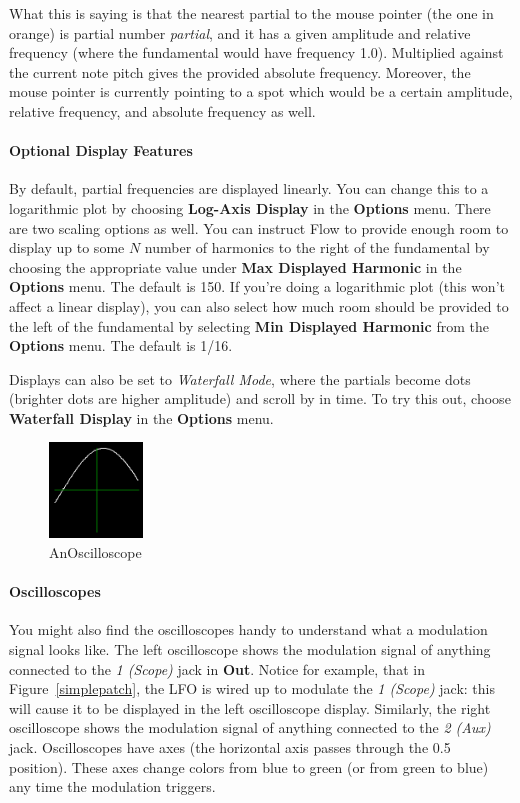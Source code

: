 \documentclass{article}
\begin{document}
What this is saying is that the nearest partial to the mouse pointer (the one in orange) is partial number {\it partial}, and it has a given amplitude and relative frequency (where the fundamental would have frequency 1.0).  Multiplied against the current note pitch gives the provided absolute frequency.  Moreover, the mouse pointer is currently pointing to a spot which would be a certain amplitude, relative frequency, and absolute frequency as well.


\paragraph{Optional Display Features}
By default, partial frequencies are displayed linearly.  You can change this to a logarithmic plot by choosing {\bf Log-Axis Display} in the {\bf Options} menu.  There are two scaling options as well.  You can instruct Flow to provide enough room to display up to some \(N\) number of harmonics to the right of the fundamental by choosing the appropriate value under {\bf Max Displayed Harmonic} in the {\bf Options} menu.  The default is 150. If you're doing a logarithmic plot (this won't affect a linear display), you can also select how much room should be provided to the left of the fundamental by selecting {\bf Min Displayed Harmonic} from the {\bf Options} menu.  The default is 1/16.

Displays can also be set to {\it Waterfall Mode}, where the partials become dots (brighter dots are higher amplitude) and scroll by in time.  To try this out, choose {\bf Waterfall Display} in the {\bf Options} menu.

\begin{figure}
\includegraphics[height=1in]{oscilloscope}
\caption{An\newline Oscilloscope}
\vspace{-1em}
\label{oscilloscope}
\end{figure}

\paragraph{Oscilloscopes}
You might also find the oscilloscopes handy to understand what a modulation signal looks like.  The left oscilloscope shows the modulation signal of anything connected to the {\it 1 (Scope)} jack in {\bf Out}.  Notice for example, that in Figure~\ref{simplepatch}, the LFO is wired up to modulate the {\it 1 (Scope)} jack: this will cause it to be displayed in the left oscilloscope display.  Similarly, the right oscilloscope shows the modulation signal of anything connected to the {\it 2 (Aux)} jack.  Oscilloscopes have axes (the horizontal axis passes through the 0.5 position).  These axes change colors from blue to green (or from green to blue) any time the modulation triggers.
\end{document}
